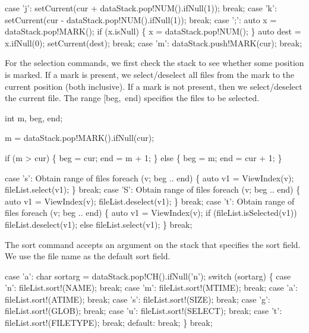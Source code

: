 \nwenddocs{}\plusendmoddef\nwstartdeflinemarkup\nwenddeflinemarkup
case 'j':
  setCurrent(cur + dataStack.pop!NUM().ifNull(1));
  break;
case 'k':
  setCurrent(cur - dataStack.pop!NUM().ifNull(1));
  break;
case ';':
  auto x = dataStack.pop!MARK();
  if (x.isNull) \{
    x = dataStack.pop!NUM();
  \}
  auto dest = x.ifNull(0);
  setCurrent(dest);
  break;
case 'm':
  dataStack.push!MARK(cur);
  break;

\nwendcode{}For the selection commands, we first check the stack to see whether
some position is marked. If a mark is present, we select/deselect all
files from the mark to the current position (both inclusive). If a
mark is not present, then we select/deselect the current file. The
range {\Tt{}[beg,\ end)\nwendquote} specifies the files to be selected.

\nwenddocs{}\plusendmoddef\nwstartdeflinemarkup\nwenddeflinemarkup
int m, beg, end;

\nwendcode{}\endmoddef\nwstartdeflinemarkup\nwenddeflinemarkup
m = dataStack.pop!MARK().ifNull(cur);

if (m > cur) \{
  beg = cur;
  end = m + 1;
\} else \{
  beg = m;
  end = cur + 1;
\}

\nwendcode{}\plusendmoddef\nwstartdeflinemarkup\nwenddeflinemarkup
case 's':
  \LA{}Obtain range of files\RA{}
  foreach (v; beg .. end) \{
    auto v1 = ViewIndex(v);
    fileList.select(v1);
  \}
  break;
case 'S':
  \LA{}Obtain range of files\RA{}
  foreach (v; beg .. end) \{
    auto v1 = ViewIndex(v);
    fileList.deselect(v1);
  \}
  break;
case 't':
  \LA{}Obtain range of files\RA{}
  foreach (v; beg .. end) \{
    auto v1 = ViewIndex(v);
    if (fileList.isSelected(v1))
      fileList.deselect(v1);
    else
      fileList.select(v1);
  \}
  break;

\nwendcode{}The sort command accepts an argument on the stack that specifies the
sort field. We use the file name as the default sort field.

\nwenddocs{}\plusendmoddef\nwstartdeflinemarkup\nwenddeflinemarkup
case 'a':
  char sortarg = dataStack.pop!CH().ifNull('n');
  switch (sortarg) \{
    case 'n': fileList.sort!(NAME);     break;
    case 'm': fileList.sort!(MTIME);    break;
    case 'a': fileList.sort!(ATIME);    break;
    case 's': fileList.sort!(SIZE);     break;
    case 'g': fileList.sort!(GLOB);     break;
    case 'u': fileList.sort!(SELECT);   break;
    case 't': fileList.sort!(FILETYPE); break;
    default:  break;
  \}
  break;


